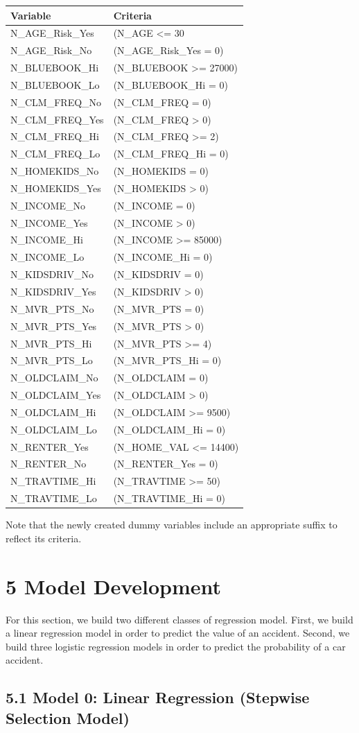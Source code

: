 \documentclass[]{article}
\begin{document}
\begin{longtable}[]{@{}ll@{}}
\toprule
Variable & Criteria\tabularnewline
\midrule
\endhead
N\_AGE\_Risk\_Yes & (N\_AGE \textless{}= 30\tabularnewline
N\_AGE\_Risk\_No & (N\_AGE\_Risk\_Yes = 0)\tabularnewline
N\_BLUEBOOK\_Hi & (N\_BLUEBOOK \textgreater{}= 27000)\tabularnewline
N\_BLUEBOOK\_Lo & (N\_BLUEBOOK\_Hi = 0)\tabularnewline
N\_CLM\_FREQ\_No & (N\_CLM\_FREQ = 0)\tabularnewline
N\_CLM\_FREQ\_Yes & (N\_CLM\_FREQ \textgreater{} 0)\tabularnewline
N\_CLM\_FREQ\_Hi & (N\_CLM\_FREQ \textgreater{}= 2)\tabularnewline
N\_CLM\_FREQ\_Lo & (N\_CLM\_FREQ\_Hi = 0)\tabularnewline
N\_HOMEKIDS\_No & (N\_HOMEKIDS = 0)\tabularnewline
N\_HOMEKIDS\_Yes & (N\_HOMEKIDS \textgreater{} 0)\tabularnewline
N\_INCOME\_No & (N\_INCOME = 0)\tabularnewline
N\_INCOME\_Yes & (N\_INCOME \textgreater{} 0)\tabularnewline
N\_INCOME\_Hi & (N\_INCOME \textgreater{}= 85000)\tabularnewline
N\_INCOME\_Lo & (N\_INCOME\_Hi = 0)\tabularnewline
N\_KIDSDRIV\_No & (N\_KIDSDRIV = 0)\tabularnewline
N\_KIDSDRIV\_Yes & (N\_KIDSDRIV \textgreater{} 0)\tabularnewline
N\_MVR\_PTS\_No & (N\_MVR\_PTS = 0)\tabularnewline
N\_MVR\_PTS\_Yes & (N\_MVR\_PTS \textgreater{} 0)\tabularnewline
N\_MVR\_PTS\_Hi & (N\_MVR\_PTS \textgreater{}= 4)\tabularnewline
N\_MVR\_PTS\_Lo & (N\_MVR\_PTS\_Hi = 0)\tabularnewline
N\_OLDCLAIM\_No & (N\_OLDCLAIM = 0)\tabularnewline
N\_OLDCLAIM\_Yes & (N\_OLDCLAIM \textgreater{} 0)\tabularnewline
N\_OLDCLAIM\_Hi & (N\_OLDCLAIM \textgreater{}= 9500)\tabularnewline
N\_OLDCLAIM\_Lo & (N\_OLDCLAIM\_Hi = 0)\tabularnewline
N\_RENTER\_Yes & (N\_HOME\_VAL \textless{}= 14400)\tabularnewline
N\_RENTER\_No & (N\_RENTER\_Yes = 0)\tabularnewline
N\_TRAVTIME\_Hi & (N\_TRAVTIME \textgreater{}= 50)\tabularnewline
N\_TRAVTIME\_Lo & (N\_TRAVTIME\_Hi = 0)\tabularnewline
\bottomrule
\end{longtable}

Note that the newly created dummy variables include an appropriate
suffix to reflect its criteria.

\section{5 Model Development}\label{model-development}

For this section, we build two different classes of regression model.
First, we build a linear regression model in order to predict the value
of an accident. Second, we build three logistic regression models in
order to predict the probability of a car accident.

\subsection{5.1 Model 0: Linear Regression (Stepwise Selection
Model)}\label{model-0-linear-regression-stepwise-selection-model}
\end{document}
